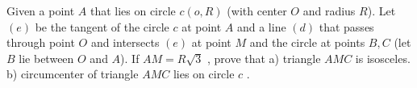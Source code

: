Given a point $A$ that lies on  circle $c(o,R)$ (with center $O$ and radius $R$). Let $(e)$ be the tangent of the circle $c$ at point $A$ and a line $(d)$ that passes through point $O$ and intersects $(e)$ at point $M$ and the circle at points $B,C$ (let $B$ lie between $O$ and $A$). If $AM = R\sqrt3$ , prove that
a) triangle $AMC$ is isosceles.
b) circumcenter of triangle  $AMC$ lies on circle $c$ .